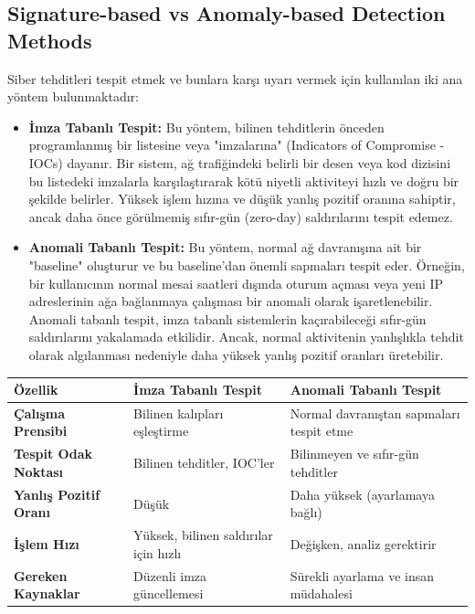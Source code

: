 \subsection{Signature-based vs Anomaly-based Detection Methods}

Siber tehditleri tespit etmek ve bunlara karşı uyarı vermek için kullanılan iki ana yöntem bulunmaktadır:


\begin{itemize}
\item \textbf{İmza Tabanlı Tespit:} Bu yöntem, bilinen tehditlerin önceden programlanmış bir listesine veya "imzalarına" (Indicators of Compromise - IOCs) dayanır. Bir sistem, ağ trafiğindeki belirli bir desen veya kod dizisini bu listedeki imzalarla karşılaştırarak kötü niyetli aktiviteyi hızlı ve doğru bir şekilde belirler. Yüksek işlem hızına ve düşük yanlış pozitif oranına sahiptir, ancak daha önce görülmemiş sıfır-gün (zero-day) saldırılarını tespit edemez.
\item \textbf{Anomali Tabanlı Tespit:} Bu yöntem, normal ağ davranışına ait bir "baseline" oluşturur ve bu baseline'dan önemli sapmaları tespit eder. Örneğin, bir kullanıcının normal mesai saatleri dışında oturum açması veya yeni IP adreslerinin ağa bağlanmaya çalışması bir anomali olarak işaretlenebilir. Anomali tabanlı tespit, imza tabanlı sistemlerin kaçırabileceği sıfır-gün saldırılarını yakalamada etkilidir. Ancak, normal aktivitenin yanlışlıkla tehdit olarak algılanması nedeniyle daha yüksek yanlış pozitif oranları üretebilir.
\end{itemize}

\begin{tabular}{|p{4cm}|p{6cm}|p{4cm}|}
\hline
\hline
\textbf{Özellik} & \textbf{İmza Tabanlı Tespit} & \textbf{Anomali Tabanlı Tespit} \\
\hline
\hline
\textbf{Çalışma Prensibi} & Bilinen kalıpları eşleştirme & Normal davranıştan sapmaları tespit etme \\
\hline
\hline
\textbf{Tespit Odak Noktası} & Bilinen tehditler, IOC'ler & Bilinmeyen ve sıfır-gün tehditler \\
\hline
\hline
\textbf{Yanlış Pozitif Oranı} & Düşük & Daha yüksek (ayarlamaya bağlı) \\
\hline
\hline
\textbf{İşlem Hızı} & Yüksek, bilinen saldırılar için hızlı & Değişken, analiz gerektirir \\
\hline
\hline
\textbf{Gereken Kaynaklar} & Düzenli imza güncellemesi & Sürekli ayarlama ve insan müdahalesi \\
\hline
\hline
\hline
\end{tabular}



